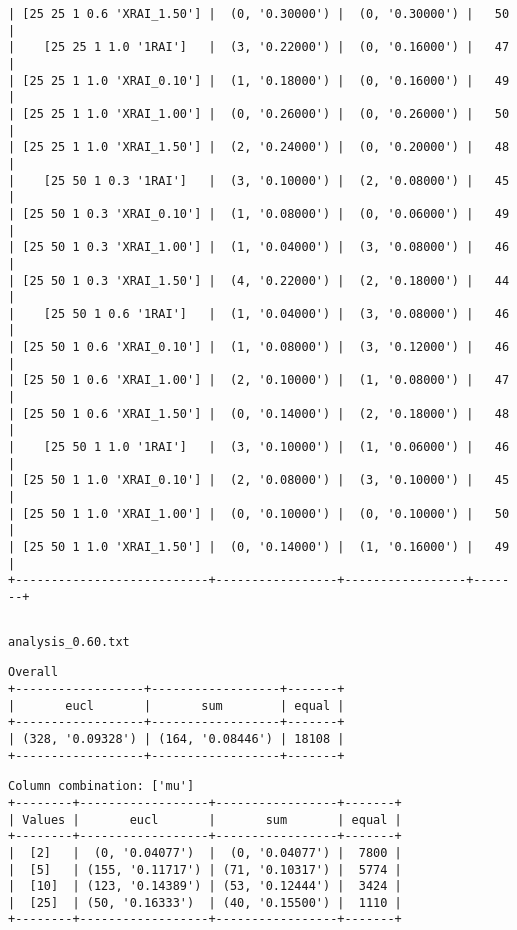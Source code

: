 \documentclass{article}
\begin{document}
\begin{verbatim}
| [25 25 1 0.6 'XRAI_1.50'] |  (0, '0.30000') |  (0, '0.30000') |   50  |
|    [25 25 1 1.0 '1RAI']   |  (3, '0.22000') |  (0, '0.16000') |   47  |
| [25 25 1 1.0 'XRAI_0.10'] |  (1, '0.18000') |  (0, '0.16000') |   49  |
| [25 25 1 1.0 'XRAI_1.00'] |  (0, '0.26000') |  (0, '0.26000') |   50  |
| [25 25 1 1.0 'XRAI_1.50'] |  (2, '0.24000') |  (0, '0.20000') |   48  |
|    [25 50 1 0.3 '1RAI']   |  (3, '0.10000') |  (2, '0.08000') |   45  |
| [25 50 1 0.3 'XRAI_0.10'] |  (1, '0.08000') |  (0, '0.06000') |   49  |
| [25 50 1 0.3 'XRAI_1.00'] |  (1, '0.04000') |  (3, '0.08000') |   46  |
| [25 50 1 0.3 'XRAI_1.50'] |  (4, '0.22000') |  (2, '0.18000') |   44  |
|    [25 50 1 0.6 '1RAI']   |  (1, '0.04000') |  (3, '0.08000') |   46  |
| [25 50 1 0.6 'XRAI_0.10'] |  (1, '0.08000') |  (3, '0.12000') |   46  |
| [25 50 1 0.6 'XRAI_1.00'] |  (2, '0.10000') |  (1, '0.08000') |   47  |
| [25 50 1 0.6 'XRAI_1.50'] |  (0, '0.14000') |  (2, '0.18000') |   48  |
|    [25 50 1 1.0 '1RAI']   |  (3, '0.10000') |  (1, '0.06000') |   46  |
| [25 50 1 1.0 'XRAI_0.10'] |  (2, '0.08000') |  (3, '0.10000') |   45  |
| [25 50 1 1.0 'XRAI_1.00'] |  (0, '0.10000') |  (0, '0.10000') |   50  |
| [25 50 1 1.0 'XRAI_1.50'] |  (0, '0.14000') |  (1, '0.16000') |   49  |
+---------------------------+-----------------+-----------------+-------+
\end{verbatim}

\begin{verbatim}

\end{verbatim}

\newpage
\verb|analysis_0.60.txt|
\begin{verbatim}
Overall
+------------------+------------------+-------+
|       eucl       |       sum        | equal |
+------------------+------------------+-------+
| (328, '0.09328') | (164, '0.08446') | 18108 |
+------------------+------------------+-------+
\end{verbatim}

\begin{verbatim}
Column combination: ['mu']
+--------+------------------+-----------------+-------+
| Values |       eucl       |       sum       | equal |
+--------+------------------+-----------------+-------+
|  [2]   |  (0, '0.04077')  |  (0, '0.04077') |  7800 |
|  [5]   | (155, '0.11717') | (71, '0.10317') |  5774 |
|  [10]  | (123, '0.14389') | (53, '0.12444') |  3424 |
|  [25]  | (50, '0.16333')  | (40, '0.15500') |  1110 |
+--------+------------------+-----------------+-------+
\end{verbatim}
\end{document}
